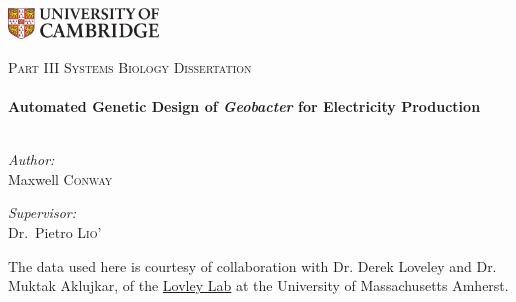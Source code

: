 
\begin{titlepage}
\begin{center}

\begin{flushleft}
\includegraphics[width=0.3\textwidth]{./logo}~\\[1cm]
\end{flushleft}

\textsc{\Large Part III Systems Biology Dissertation}\\[0.5cm]

\HRule \\[0.4cm]
{ \huge \bfseries Automated Genetic Design of \textit{Geobacter} for Electricity Production}\\[0.4cm]

\HRule \\[1.5cm]

\begin{minipage}{0.4\textwidth}
\begin{flushleft} \large
\emph{Author:}\\
Maxwell \textsc{Conway}
\end{flushleft}
\end{minipage}
\begin{minipage}{0.4\textwidth}
\begin{flushright} \large
\emph{Supervisor:} \\
Dr.~Pietro \textsc{Lio'}
\end{flushright}
\end{minipage}
\vspace{1cm}

The data used here is courtesy of collaboration with Dr. Derek Loveley and Dr. Muktak Aklujkar, of the \href{http://www.geobacter.org/}{Lovley Lab} at the University of Massachusetts Amherst.
\vspace{1cm}

\begin{abstract}

\end{abstract}

\end{center}
\end{titlepage}
